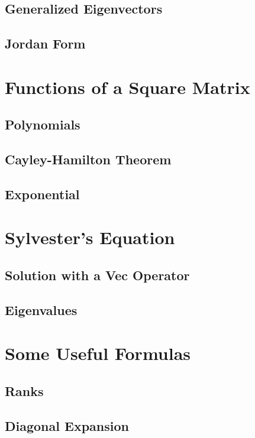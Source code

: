 \documentclass{article}
\begin{document}
\subsection{Generalized Eigenvectors}

\subsection{Jordan Form}

\section{Functions of a Square Matrix}

\subsection{Polynomials}

\subsection{Cayley-Hamilton Theorem}

\subsection{Exponential}

\section{Sylvester's Equation}

\subsection{Solution with a Vec Operator}

\subsection{Eigenvalues}

\section{Some Useful Formulas}

\subsection{Ranks}

\subsection{Diagonal Expansion}
\end{document}
